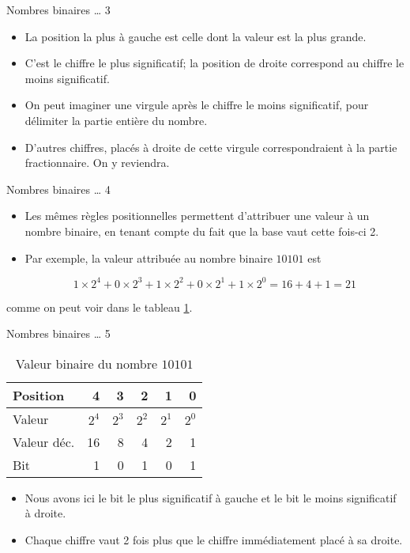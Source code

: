 \documentclass[presentation]{beamer}
\begin{document}
\begin{frame}[label={sec:org8e454ca}]{Nombres binaires \ldots{} 3}
\begin{itemize}
\item La position la plus à gauche est celle dont la valeur est la plus grande.

\item C'est le \alert{chiffre le plus significatif}; la position de droite correspond au \alert{chiffre le moins significatif}.

\item On peut imaginer une virgule après le chiffre le moins significatif, pour délimiter la partie entière du nombre.

\item D'autres chiffres, placés à droite de cette virgule correspondraient à la partie fractionnaire.  On y reviendra.
\end{itemize}
\end{frame}

\begin{frame}[label={sec:org36f7f94}]{Nombres binaires \ldots{} 4}
\begin{itemize}
\item Les mêmes règles positionnelles permettent d'attribuer une valeur à un nombre binaire, en tenant compte du fait que la base vaut cette fois-ci 2.

\item Par exemple, la valeur attribuée au nombre binaire \(10101\) est

$$ 1 \times 2^4 + 0 \times 2^3 + 1 \times 2^2 + 0 \times 2^1 + 1 \times 2^0 = 16+4+1= 21 $$
\end{itemize}

comme on peut voir dans le tableau \ref{tab:orgdd880d8}.
\end{frame}

\begin{frame}[label={sec:org089edbb}]{Nombres binaires \ldots{} 5}
\begin{table}[htbp]
\caption{\label{tab:orgdd880d8}Valeur binaire du nombre \(10101\)}
\centering
\begin{tabular}{lrrrrr}
Position & 4 & 3 & 2 & 1 & 0\\
\hline
Valeur & \(2^4\) & \(2^3\) & \(2^2\) & \(2^1\) & \(2^0\)\\
Valeur déc. & 16 & 8 & 4 & 2 & 1\\
Bit & 1 & 0 & 1 & 0 & 1\\
\end{tabular}
\end{table}

\begin{itemize}
\item Nous avons ici le \alert{bit le plus significatif} à gauche et le \alert{bit le moins significatif} à droite.

\item Chaque chiffre vaut 2 fois plus que le chiffre immédiatement placé à sa droite.
\end{itemize}
\end{frame}
\end{document}
